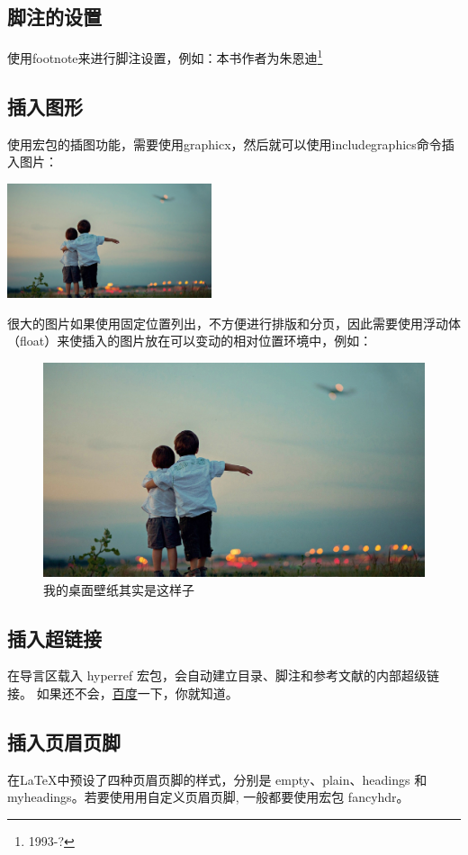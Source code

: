 \documentclass[12pt, a4paper,openany]{book}%
\begin{document}
\subsection{脚注的设置}
使用footnote来进行脚注设置，例如：本书作者为朱恩迪\footnote{1993-?}

\subsection{插入图形}
使用宏包的插图功能，需要使用graphicx，然后就可以使用includegraphics命令插入图片：

\includegraphics[width=6cm]{desk.jpg}

很大的图片如果使用固定位置列出，不方便进行排版和分页，因此需要使用浮动体（float）来使插入的图片放在可以变动的相对位置环境中，例如：

\begin{figure}[ht]
\centering
\includegraphics[scale=0.3]{desk.jpg}
\caption{我的桌面壁纸其实是这样子}
\label{fig:desk}
\end{figure}

\subsection{插入超链接}
在导言区载入 hyperref 宏包，会自动建立目录、脚注和参考文献的内部超级链接。
如果还不会，\href{http://www.baidu.com}{百度}一下，你就知道。

\subsection{插入页眉页脚}
在\LaTeX{}中预设了四种页眉页脚的样式，分别是 empty、plain、headings 和
myheadings。若要使用用自定义页眉页脚, 一般都要使用宏包 fancyhdr。
\end{document}
